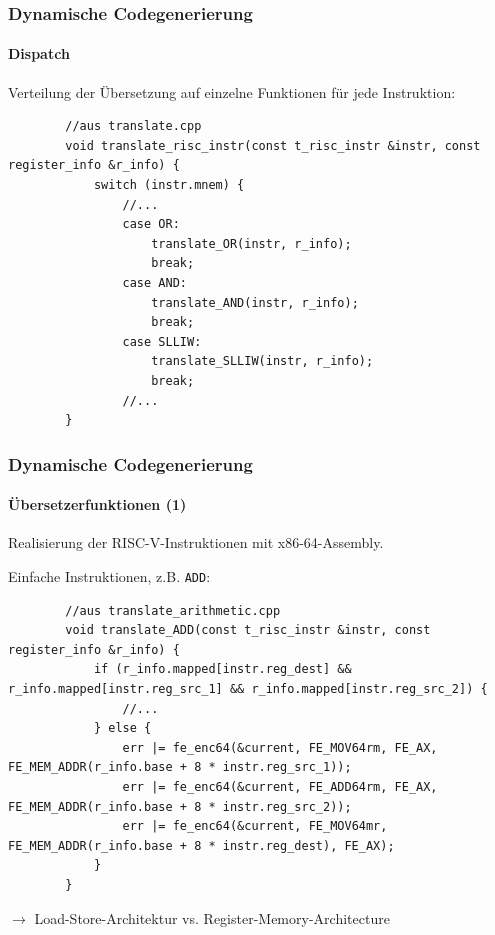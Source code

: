 \documentclass[german]{tum-presentation}
\newcommand{\refer}[0]{\ensuremath{\rightarrow} }
\begin{document}
%	
%	

\begin{frame}[fragile]
	\frametitle{Dynamische Codegenerierung}
	\framesubtitle{Dispatch}
	
	Verteilung der Übersetzung auf einzelne Funktionen für jede Instruktion:
	
	\begin{lstlisting}
		//aus translate.cpp
		void translate_risc_instr(const t_risc_instr &instr, const register_info &r_info) {
			switch (instr.mnem) {
				//...
				case OR:
					translate_OR(instr, r_info);
					break;
				case AND:
					translate_AND(instr, r_info);
					break;
				case SLLIW:
					translate_SLLIW(instr, r_info);
					break;
				//...
		}
	\end{lstlisting}
\end{frame}

\begin{frame}[fragile]
	\frametitle{Dynamische Codegenerierung}
	\framesubtitle{Übersetzerfunktionen (1)}
	
	Realisierung der RISC-V-Instruktionen mit x86-64-Assembly.
	
	\pause
	\vspace{0.3cm}
	Einfache Instruktionen, z.B. \verb!ADD!:
	\begin{lstlisting}
		//aus translate_arithmetic.cpp
		void translate_ADD(const t_risc_instr &instr, const register_info &r_info) {
			if (r_info.mapped[instr.reg_dest] && r_info.mapped[instr.reg_src_1] && r_info.mapped[instr.reg_src_2]) {
				//...
			} else {
				err |= fe_enc64(&current, FE_MOV64rm, FE_AX, FE_MEM_ADDR(r_info.base + 8 * instr.reg_src_1));
				err |= fe_enc64(&current, FE_ADD64rm, FE_AX, FE_MEM_ADDR(r_info.base + 8 * instr.reg_src_2));
				err |= fe_enc64(&current, FE_MOV64mr, FE_MEM_ADDR(r_info.base + 8 * instr.reg_dest), FE_AX);
			}
		}
	\end{lstlisting}
	
	\refer Load-Store-Architektur vs. Register-Memory-Architecture
\end{frame}
\end{document}
